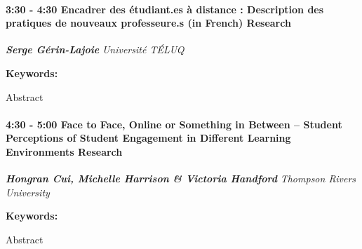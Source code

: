 \documentclass[
]{book}
\begin{document}
\begin{session}
\hypertarget{encadrer-des-uxe9tudiant.es-uxe0-distance-description-des-pratiques-de-nouveaux-professeure.s-in-french-research}{%
\paragraph*{\texorpdfstring{3:30 - 4:30 \textbar{} \textbf{Encadrer des
étudiant.es à distance : Description des pratiques de nouveaux
professeure.s (in French)} \textbar{}
Research}{3:30 - 4:30 \textbar{} Encadrer des étudiant.es à distance : Description des pratiques de nouveaux professeure.s (in French) \textbar{} Research}}\label{encadrer-des-uxe9tudiant.es-uxe0-distance-description-des-pratiques-de-nouveaux-professeure.s-in-french-research}}

\textbf{\emph{Serge Gérin-Lajoie}} \textbar{} \emph{Université TÉLUQ}

\textbf{Keywords:}

Abstract
\end{session}

\begin{session}
\hypertarget{face-to-face-online-or-something-in-between-student-perceptions-of-student-engagement-in-different-learning-environments-research}{%
\paragraph*{\texorpdfstring{4:30 - 5:00 \textbar{} \textbf{Face to Face,
Online or Something in Between -- Student Perceptions of Student
Engagement in Different Learning Environments} \textbar{}
Research}{4:30 - 5:00 \textbar{} Face to Face, Online or Something in Between -- Student Perceptions of Student Engagement in Different Learning Environments \textbar{} Research}}\label{face-to-face-online-or-something-in-between-student-perceptions-of-student-engagement-in-different-learning-environments-research}}

\textbf{\emph{Hongran Cui, Michelle Harrison \& Victoria Handford}}
\textbar{} \emph{Thompson Rivers University}

\textbf{Keywords:}

Abstract
\end{session}
\end{document}
